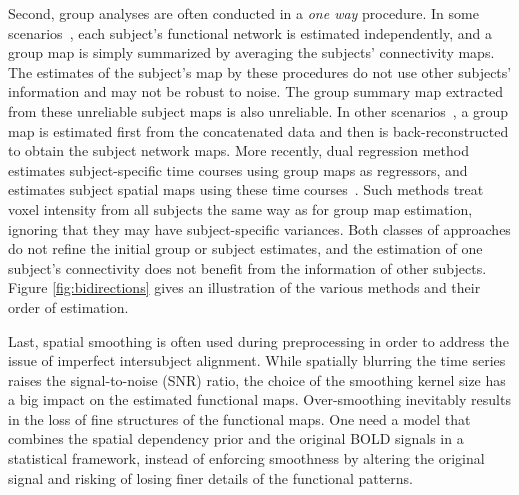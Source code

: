 \documentclass[review,authoryear]{elsarticle}
\begin{document}
Second, group analyses are often conducted in a \emph{one way} procedure. In
some scenarios~\citep{van2008normalized, craddock2012whole, greicius2004default,
  greicius2007resting, seeley2009neurodegenerative, mohammadi2009changes}, each
subject's functional network is estimated independently, and a group map is
simply summarized by averaging the subjects' connectivity maps. The estimates of
the subject's map by these procedures do not use other subjects' information and
may not be robust to noise. The group summary map extracted from these
unreliable subject maps is also unreliable. In other
scenarios~\citep{calhoun2001method}, a group map is estimated first from the
concatenated data and then is back-reconstructed to obtain the subject network
maps. More recently, dual regression method estimates subject-specific time
courses using group maps as regressors, and estimates subject spatial maps using
these time courses~\citep{filippini2009distinct,beckmann2009group}. Such methods
treat voxel intensity from all subjects the same way as for group map
estimation, ignoring that they may have subject-specific variances. Both classes
of approaches do not refine the initial group or subject estimates,
and the estimation of one subject's connectivity does not benefit from the
information of other subjects. Figure \ref{fig:bidirections} gives an
illustration of the various methods and their order of estimation.

Last, spatial smoothing is often used during preprocessing in order to address
the issue of imperfect intersubject alignment. While spatially blurring the time
series raises the signal-to-noise (SNR) ratio, the choice of the smoothing kernel size
has a big impact on the estimated functional maps. Over-smoothing inevitably
results in the loss of fine structures of the functional maps. One need a model
that combines the spatial dependency prior and the original BOLD signals in a
statistical framework, instead of enforcing smoothness by altering the original
signal and risking of losing finer details of the functional patterns. 
\end{document}
